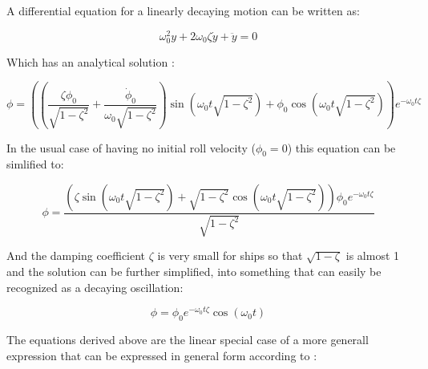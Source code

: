 A differential equation for a linearly decaying motion can be written
as:
 
            
    
    \begin{equation}
\omega_{0}^{2} y + 2 \omega_{0} \zeta \dot{y} + \ddot{y} = 0
\label{eq:equation}
\end{equation}

    

    Which has an analytical solution \cite{undefined}:
 
            
    
    \begin{equation}
\phi = \left(\left(\frac{\zeta \phi_{0}}{\sqrt{1 - \zeta^{2}}} + \frac{\dot{\phi}_{0}}{\omega_{0} \sqrt{1 - \zeta^{2}}}\right) \operatorname{sin}\left(\omega_{0} t \sqrt{1 - \zeta^{2}}\right) + \phi_{0} \operatorname{cos}\left(\omega_{0} t \sqrt{1 - \zeta^{2}}\right)\right) e^{- \omega_{0} t \zeta}
\label{eq:equation}
\end{equation}

    

    In the usual case of having no initial roll velocity (\(\phi_0=0\)) this
equation can be simlified to:
 
            
    
    \begin{equation}
\phi = \frac{\left(\zeta \operatorname{sin}\left(\omega_{0} t \sqrt{1 - \zeta^{2}}\right) + \sqrt{1 - \zeta^{2}} \operatorname{cos}\left(\omega_{0} t \sqrt{1 - \zeta^{2}}\right)\right) \phi_{0} e^{- \omega_{0} t \zeta}}{\sqrt{1 - \zeta^{2}}}
\label{eq:equation}
\end{equation}

    

    And the damping coefficient \(\zeta\) is very small for ships so that
\(\sqrt{1-\zeta}\) is almost 1 and the solution can be further
simplified, into something that can easily be recognized as a decaying
oscillation:
 
            
    
    \begin{equation}
\phi = \phi_{0} e^{- \omega_{0} t \zeta} \operatorname{cos}\left(\omega_{0} t\right)
\label{eq:equation}
\end{equation}

    

    The equations derived above are the linear special case of a more
generall expression that can be expressed in general form according to
\cite{7505983/FB64RGPF}:
 
